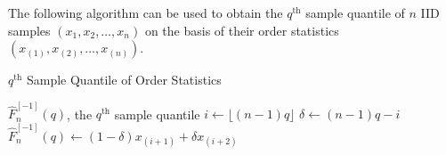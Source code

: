 The following algorithm can be used to obtain the $q^{\text{th}}$ sample quantile of $n$ IID samples $(x_1,x_2,\ldots,x_n)$ on the basis of their order statistics $(x_{(1)},x_{(2)},\ldots,x_{(n)})$.
\begin{algorithm}
\caption{$q^{\text{th}}$ Sample Quantile of Order Statistics}
\label{A:qthSampleQuantile}
\begin{algorithmic}[1]
 $ \widehat{F}_n^{[-1]}(q)$, the $q^{\text{th}}$ sample quantile
\STATE $i \gets \lfloor (n-1) q \rfloor$
\STATE $\delta \gets (n-1) q - i$
\ELSE
\STATE $ \widehat{F}_n^{[-1]}(q) \gets (1 - \delta) x_{(i+1)} + \delta x_{(i+2)}$
\ENDIF
{}
\end{algorithmic}
\end{algorithm}

